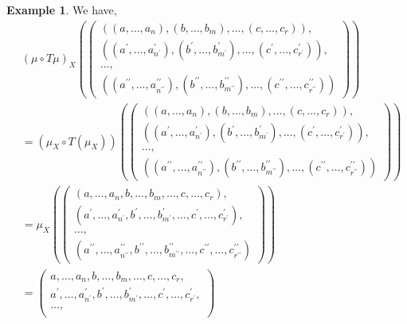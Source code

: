 \documentclass[11pt,a4paper]{article}
\theoremstyle{definition}
\newtheorem{example}[thm]{Example}
\numberwithin{equation}{section}
\begin{document}
\begin{example}
    We have,
    \begin{align*}
        &(\mu \circ T\mu)_X(\begin{pmatrix}
        ((a,\dots, a_n),(b,\dots ,b_m),\dots,(c,\dots, c_r)), \\
        ((a^\prime,\dots, a^\prime_{n^\prime}),(b^\prime,\dots, b^\prime_{m^\prime}),\dots,(c^\prime,\dots, c^\prime_{r^\prime})), \\
        \dots, \\
        ((a^{\prime\prime},\dots, a^{\prime\prime}_{n^{\prime\prime}}),(b^{\prime\prime},\dots ,b^{\prime\prime}_{m^{\prime\prime}}),\dots,(c^{\prime\prime},\dots, c^{\prime\prime}_{r^{\prime\prime}}))
    \end{pmatrix}) \\
    &= (\mu_{X} \circ T(\mu_{X}))(\begin{pmatrix}
        ((a,\dots, a_n),(b,\dots ,b_m),\dots,(c,\dots, c_r)), \\
        ((a^\prime,\dots, a^\prime_{n^\prime}),(b^\prime,\dots, b^\prime_{m^\prime}),\dots,(c^\prime,\dots, c^\prime_{r^\prime})), \\
        \dots, \\
        ((a^{\prime\prime},\dots, a^{\prime\prime}_{n^{\prime\prime}}),(b^{\prime\prime},\dots ,b^{\prime\prime}_{m^{\prime\prime}}),\dots,(c^{\prime\prime},\dots, c^{\prime\prime}_{r^{\prime\prime}}))
    \end{pmatrix})\\
        &= \mu_{X}(\begin{pmatrix}
        (a,\dots, a_n,b,\dots ,b_m,\dots,c,\dots, c_r), \\
        (a^\prime,\dots, a^\prime_{n^\prime},b^\prime,\dots, b^\prime_{m^\prime},\dots,c^\prime,\dots, c^\prime_{r^\prime}), \\
        \dots, \\
        (a^{\prime\prime},\dots, a^{\prime\prime}_{n^{\prime\prime}},b^{\prime\prime},\dots ,b^{\prime\prime}_{m^{\prime\prime}},\dots,c^{\prime\prime},\dots, c^{\prime\prime}_{r^{\prime\prime}})
    \end{pmatrix})\\
    &= \begin{pmatrix}
        a,\dots, a_n,b,\dots ,b_m,\dots,c,\dots, c_r, \\
        a^\prime,\dots, a^\prime_{n^\prime},b^\prime,\dots, b^\prime_{m^\prime},\dots,c^\prime,\dots, c^\prime_{r^\prime}, \\
        \dots, \\

\end{pmatrix}
\end{align*}
\end{example}
\end{document}
